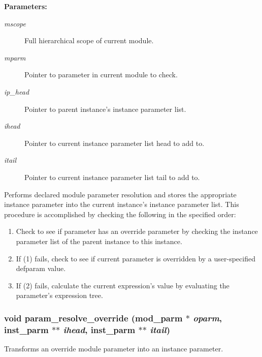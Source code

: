 \begin{Desc}
\item[{\bf Parameters: }]\par
\begin{description}
\item[
{\em mscope}]Full hierarchical scope of current module. \item[
{\em mparm}]Pointer to parameter in current module to check. \item[
{\em ip\_\-head}]Pointer to parent instance's instance parameter list. \item[
{\em ihead}]Pointer to current instance parameter list head to add to. \item[
{\em itail}]Pointer to current instance parameter list tail to add to.

\end{description}
\end{Desc}
Performs declared module parameter resolution and stores the appropriate instance parameter into the current instance's instance parameter list. This procedure is accomplished by checking the following in the specified order:\begin{enumerate}
\item 
Check to see if parameter has an override parameter by checking the instance parameter list of the parent instance to this instance.\item 
If (1) fails, check to see if current parameter is overridden by a user-specified defparam value.\item 
If (2) fails, calculate the current expression's value by evaluating the parameter's expression tree. \end{enumerate}
\subsubsection{\setlength{\rightskip}{0pt plus 5cm}void param\_\-resolve\_\-override ({\bf mod\_\-parm} $\ast$ {\em oparm}, {\bf inst\_\-parm} $\ast$$\ast$ {\em ihead}, {\bf inst\_\-parm} $\ast$$\ast$ {\em itail})}\label{param_8h_a11}


Transforms an override module parameter into an instance parameter.

